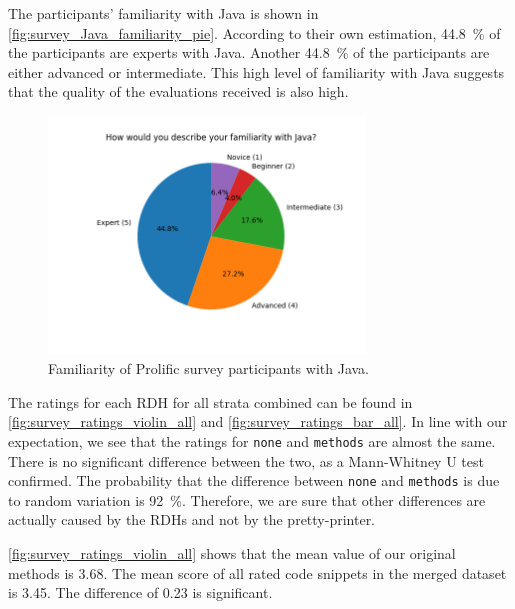 \documentclass[%
class=scrreprt,
chapterprefix=false,%
open=right,%
twoside=false,%
paper=a4,%
logofile={Logo\_zentral\_farbig\_EN.png},%
thesistype=master,%
UKenglish,%
]{se2thesis}
\theoremstyle{definition}
\begin{document}
	The participants' familiarity with Java is shown in \autoref{fig:survey_Java_familiarity_pie}. According to their own estimation, 44.8~\% of the participants are experts with Java. Another 44.8~\% of the participants are either advanced or intermediate. This high level of familiarity with Java suggests that the quality of the evaluations received is also high.
	
	\begin{figure}[tb]
		\centering
		\includegraphics[width=0.75\textwidth]{img/survey_Java_familiarity_pie.png}
		\caption{Familiarity of Prolific survey participants with Java.}
		\label{fig:survey_Java_familiarity_pie}
	\end{figure}
	
	The ratings for each RDH for all strata combined can be found in \autoref{fig:survey_ratings_violin_all} and \autoref{fig:survey_ratings_bar_all}. 	
	In line with our expectation, we see that the ratings for \texttt{none} and \texttt{methods} are almost the same. There is no significant difference between the two, as a Mann-Whitney U test confirmed. The probability that the difference between \texttt{none} and \texttt{methods} is due to random variation is 92~\%. 
	Therefore, we are sure that other differences are actually caused by the RDHs and not by the pretty-printer.

	\autoref{fig:survey_ratings_violin_all} shows that the mean value of our original methods is 3.68. The mean score of all rated code snippets in the merged dataset is 3.45. The difference of 0.23 is significant.
	
	
\end{document}
